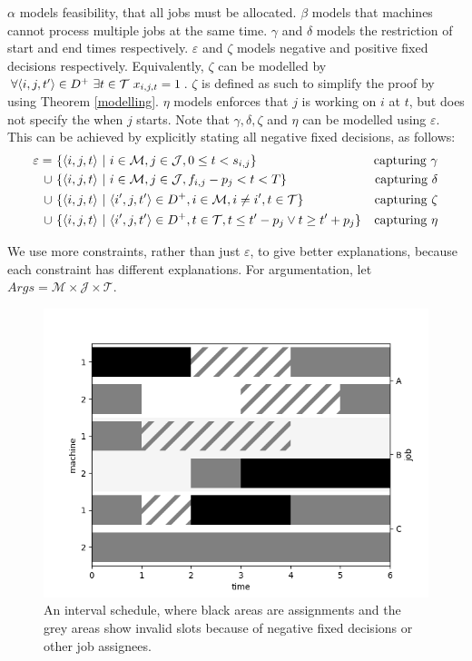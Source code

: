 $\alpha$ models feasibility, that all jobs must be allocated. $\beta$ models that machines cannot process multiple jobs at the same time. $\gamma$ and $\delta$ models the restriction of start and end times respectively. $\varepsilon$ and $\zeta$ models negative and positive fixed decisions respectively. Equivalently, $\zeta$ can be modelled by $\forall\langle{i},{j},{t'}\rangle\in D^+\ \exists t\in\mathcal{T}\ x_{i,j,t}=1$. $\zeta$ is defined as such to simplify the proof by using Theorem \ref{modelling}. $\eta$ models enforces that $j$ is working on $i$ at $t$, but does not specify the when $j$ starts. Note that $\gamma,\delta,\zeta$ and $\eta$ can be modelled using $\varepsilon$. This can be achieved by explicitly stating all negative fixed decisions, as follows:
\begin{align*}
	\varepsilon=\ &\{\triple{i}{j}{t}\ |\ i\in\mathcal{M},j\in\mathcal{J},0\leq t<s_{i,j}\}&\text{capturing }\gamma\\
	\cup\ &\{\triple{i}{j}{t}\ |\ i\in\mathcal{M},j\in\mathcal{J},f_{i,j}-p_j<t<T\}&\text{capturing }\delta\\
	\cup\ &\{\triple{i}{j}{t}\ |\ \triple{i'}{j}{t'}\in D^+,i\in\mathcal{M},i\neq i', t\in\mathcal{T}\}&\text{capturing }\zeta\\
	\cup\ &\{\triple{i}{j}{t}\ |\ \triple{i'}{j}{t'}\in D^+,t\in\mathcal{T},t\leq t'-p_j\lor t\geq t'+p_j\}&\text{capturing }\eta
\end{align*}

We use more constraints, rather than just $\varepsilon$, to give better explanations, because each constraint has different explanations. For argumentation, let $Args=\mathcal{M}\times\mathcal{J}\times\mathcal{T}$.

\begin{figure}[H]
	\begin{center}
		\includegraphics[width=.8\linewidth]{figures/interval.png}	
	\end{center}
	\caption{An interval schedule, where black areas are assignments and the grey areas show invalid slots because of negative fixed decisions or other job assignees.}
\end{figure}

